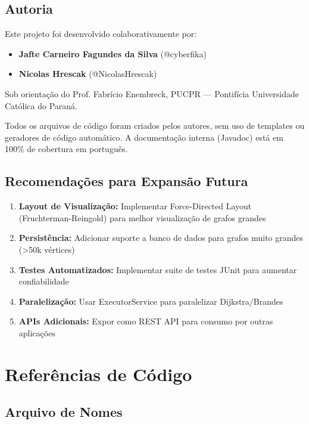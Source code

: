 \documentclass[12pt,a4paper]{article}
\begin{document}
\subsection{Autoria}

Este projeto foi desenvolvido colaborativamente por:

\begin{itemize}
    \item \textbf{Jafte Carneiro Fagundes da Silva} (@cyberfika)
    \item \textbf{Nicolas Hrescak} (@NicolasHrescak)
\end{itemize}

Sob orientação do Prof. Fabrício Enembreck, PUCPR — Pontifícia Universidade Católica do Paraná.

Todos os arquivos de código foram criados pelos autores, sem uso de templates ou geradores de código automático. A documentação interna (Javadoc) está em 100\% de cobertura em português.

\subsection{Recomendações para Expansão Futura}

\begin{enumerate}
    \item \textbf{Layout de Visualização:} Implementar Force-Directed Layout (Fruchterman-Reingold) para melhor visualização de grafos grandes
    \item \textbf{Persistência:} Adicionar suporte a banco de dados para grafos muito grandes (>50k vértices)
    \item \textbf{Testes Automatizados:} Implementar suite de testes JUnit para aumentar confiabilidade
    \item \textbf{Paralelização:} Usar ExecutorService para paralelizar Dijkstra/Brandes
    \item \textbf{APIs Adicionais:} Expor como REST API para consumo por outras aplicações
\end{enumerate}

\appendix

\section{Referências de Código}

\subsection{Arquivo de Nomes}
\end{document}
